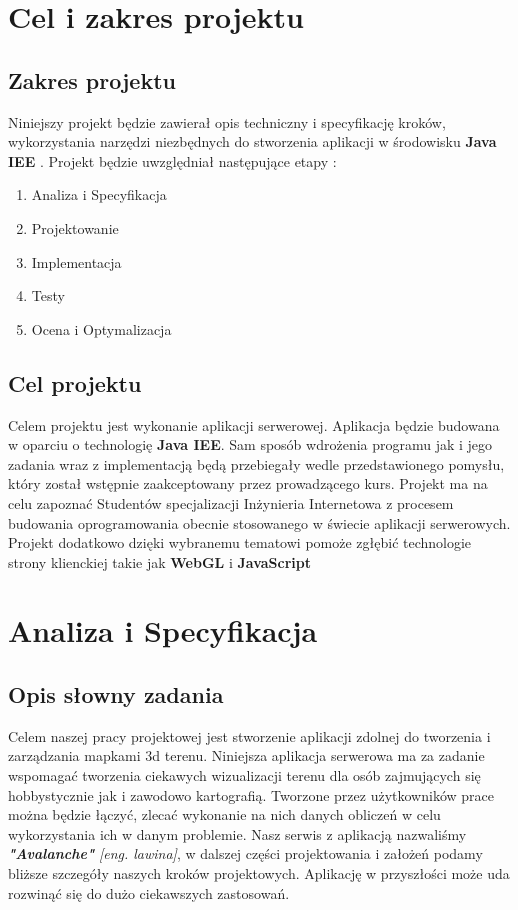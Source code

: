 \chapter{Cel i zakres projektu}
\section{Zakres projektu}
Niniejszy projekt będzie zawierał opis techniczny i specyfikację kroków, wykorzystania narzędzi niezbędnych do stworzenia aplikacji w środowisku \textbf{Java IEE} .
Projekt będzie uwzględniał następujące etapy : 
\begin{enumerate}
\item{Analiza i Specyfikacja}
\item{Projektowanie}
\item{Implementacja}
\item{Testy}
\item{Ocena i Optymalizacja}
\end{enumerate}

\section{Cel projektu}
Celem projektu jest wykonanie aplikacji serwerowej. 
Aplikacja będzie budowana w oparciu o technologię \textbf{Java IEE}.
Sam sposób wdrożenia programu jak i jego zadania wraz z implementacją będą przebiegały wedle przedstawionego pomysłu, który został wstępnie zaakceptowany przez prowadzącego kurs.
Projekt ma na celu zapoznać Studentów specjalizacji Inżynieria Internetowa z procesem 
budowania oprogramowania obecnie stosowanego w świecie aplikacji serwerowych.
Projekt dodatkowo dzięki wybranemu tematowi pomoże zgłębić technologie strony klienckiej
takie jak \textbf{WebGL} i \textbf{JavaScript}

\chapter{Analiza i Specyfikacja}
\section{Opis słowny zadania}
Celem naszej pracy projektowej jest stworzenie aplikacji zdolnej do tworzenia i zarządzania mapkami 3d terenu.
Niniejsza aplikacja serwerowa ma za zadanie wspomagać tworzenia ciekawych wizualizacji terenu dla osób zajmujących się hobbystycznie jak i zawodowo kartografią.
Tworzone przez użytkowników prace można będzie łączyć, zlecać wykonanie na nich danych obliczeń w celu wykorzystania ich w danym problemie.
Nasz serwis z aplikacją nazwaliśmy \\\textbf{\textit{"Avalanche"}} \textit{[eng. lawina]}, w dalszej części projektowania i założeń podamy bliższe szczegóły naszych kroków projektowych.
Aplikację w przyszłości może uda rozwinąć się do dużo ciekawszych zastosowań.
